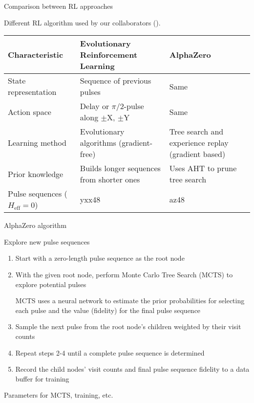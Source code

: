\documentclass{beamer}
\begin{document}
\begin{frame}{Comparison between RL approaches}

Different RL algorithm used by our collaborators (\cite{peng2021deep}).

\begin{table}
\centering
\begin{footnotesize}
\begin{tabular}{p{}|p{}|p{}}
    Characteristic & Evolutionary Reinforcement Learning & AlphaZero \\
    \hline
    State representation & Sequence of previous pulses & Same \\
    \hline
    Action space & Delay or $\pi/2$-pulse along $\pm$X, $\pm$Y & Same \\
    \hline
    Learning method & Evolutionary algorithms (gradient-free) & Tree search and experience replay (gradient based) \\
    \hline
    Prior knowledge & Builds longer sequences from shorter ones & Uses AHT to prune tree search \\
    \hline
    Pulse sequences ($H_\text{eff} = 0$) & yxx48 & az48
\end{tabular}
\end{footnotesize}
\end{table}

\end{frame}



\begin{frame}{AlphaZero algorithm}


Explore new pulse sequences

\begin{enumerate}

\item
Start with a zero-length pulse sequence as the root node
\item
With the given root node, perform Monte Carlo Tree Search (MCTS) to
explore potential pulses

MCTS uses a neural network to estimate the prior probabilities for
selecting each pulse and the value (fidelity) for the final pulse
sequence

\item
Sample the next pulse from the root node's children weighted by
their visit counts
\item
Repeat steps 2-4 until a complete pulse sequence is determined
\item
Record the child nodes' visit counts and final pulse sequence
fidelity to a data buffer for training
\end{enumerate}

Parameters for MCTS, training, etc.
\end{frame}
\end{document}
